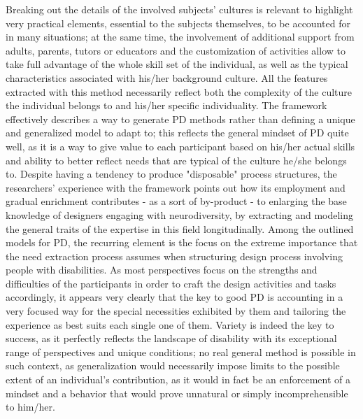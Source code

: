 Breaking out the details of the involved subjects' cultures is relevant to highlight very
practical elements, essential to the subjects themselves, to be accounted for in many
situations; at the same time, the involvement of additional support from adults, parents,
tutors or educators and the customization of activities allow to take full advantage of the
whole skill set of the individual, as well as the typical characteristics associated with his/her
background culture. All the features extracted with this method necessarily reflect both the complexity of the
culture the individual belongs to and his/her specific individuality.
The framework effectively describes a way to generate PD methods rather than defining
a unique and generalized model to adapt to; this reflects the general mindset of PD quite
well, as it is a way to give value to each participant based on his/her actual skills and ability
to better reflect needs that are typical of the culture he/she belongs to. Despite having a tendency to produce "disposable" process structures, the researchers'
experience with the framework points out how its employment and gradual enrichment
contributes - as a sort of by-product - to enlarging the base knowledge of designers
engaging with neurodiversity, by extracting and modeling the general traits of the
expertise in this field longitudinally.
Among the outlined models for PD, the recurring element is the focus on the extreme
importance that the need extraction process assumes when structuring design process
involving people with disabilities.
As most perspectives focus on the strengths and difficulties of the participants in order to
craft the design activities and tasks accordingly, it appears very clearly that the key to good
PD is accounting in a very focused way for the special necessities exhibited by them and
tailoring the experience as best suits each single one of them.
Variety is indeed the key to success, as it perfectly reflects the landscape of disability with
its exceptional range of perspectives and unique conditions; no real general method is
possible in such context, as generalization would necessarily impose limits to the possible
extent of an individual's contribution, as it would in fact be an enforcement of a mindset
and a behavior that would prove unnatural or simply incomprehensible to him/her.

 